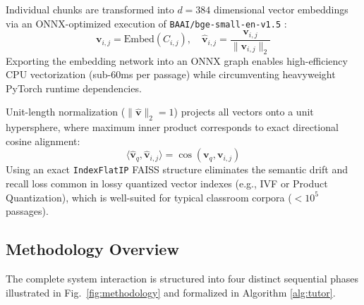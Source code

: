 \documentclass[conference]{IEEEtran}
\begin{document}
Individual chunks are transformed into $d=384$ dimensional vector embeddings via an ONNX-optimized execution of \texttt{BAAI/bge-small-en-v1.5} \cite{karpukhin2020dense}:
\begin{equation}
\mathbf{v}_{i,j} = \text{Embed}(C_{i,j}), \quad \mathbf{\hat{v}}_{i,j} = \frac{\mathbf{v}_{i,j}}{\|\mathbf{v}_{i,j}\|_2}
\end{equation}
Exporting the embedding network into an ONNX graph enables high-efficiency CPU vectorization (sub-60ms per passage) while circumventing heavyweight PyTorch runtime dependencies.

Unit-length normalization ($\|\mathbf{\hat{v}}\|_2 = 1$) projects all vectors onto a unit hypersphere, where maximum inner product corresponds to exact directional cosine alignment:
\begin{equation}
\langle \mathbf{\hat{v}}_q, \mathbf{\hat{v}}_{i,j} \rangle = \cos(\mathbf{v}_q, \mathbf{v}_{i,j})
\end{equation}
Using an exact \texttt{IndexFlatIP} FAISS structure eliminates the semantic drift and recall loss common in lossy quantized vector indexes (e.g., IVF or Product Quantization), which is well-suited for typical classroom corpora ($< 10^5$ passages).

\subsection{Methodology Overview}
The complete system interaction is structured into four distinct sequential phases illustrated in Fig.~\ref{fig:methodology} and formalized in Algorithm \ref{alg:tutor}.
\end{document}
